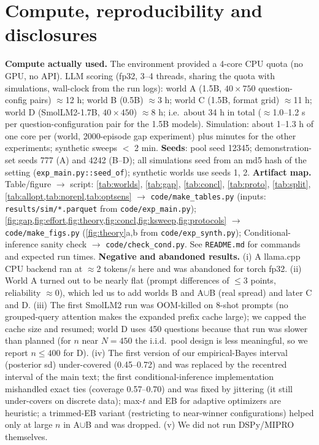 \section{Compute, reproducibility and disclosures}
\label{app:repro}
\textbf{Compute actually used.} The environment provided a 4-core CPU quota (no GPU, no API). LLM scoring (fp32, 3--4 threads, sharing the quota with simulations, wall-clock from the run logs): world A (1.5B, $40\times750$ question-config pairs) $\approx$12 h; world B (0.5B) $\approx$3 h; world C (1.5B, format grid) $\approx$11 h; world D (SmolLM2-1.7B, $40\times450$) $\approx$8 h; i.e.\ about 34 h in total ($\approx$1.0--1.2 s per question-configuration pair for the 1.5B models). Simulation: about 1--1.3 h of one core per (world, 2000-episode gap experiment) plus minutes for the other experiments; synthetic sweeps $<$ 2 min. \textbf{Seeds}: pool seed 12345; demonstration-set seeds 777 (A) and 4242 (B--D); all simulations seed from an md5 hash of the setting (\texttt{exp\_main.py::seed\_of}); synthetic worlds use seeds 1, 2.
\textbf{Artifact map.} Table/figure $\to$ script: \cref{tab:worlds}, \cref{tab:gap}, \cref{tab:concl}, \cref{tab:proto}, \cref{tab:split}, \cref{tab:allopt,tab:norepl,tab:optsens} $\to$ \texttt{code/make\_tables.py} (inputs: \texttt{results/sim/*.parquet} from \texttt{code/exp\_main.py}); \cref{fig:gap,fig:effort,fig:theory,fig:concl,fig:ksweep,fig:protocols} $\to$ \texttt{code/make\_figs.py} (\cref{fig:theory}a,b from \texttt{code/exp\_synth.py}); Conditional-inference sanity check $\to$ \texttt{code/check\_cond.py}. See \texttt{README.md} for commands and expected run times.
\textbf{Negative and abandoned results.} (i) A llama.cpp CPU backend ran at $\approx$2 tokens/s here and was abandoned for torch fp32. (ii) World A turned out to be nearly flat (prompt differences of $\le$3 points, reliability $\approx 0$), which led us to add worlds B and A$\cup$B (real spread) and later C and D. (iii) The first SmolLM2 run was OOM-killed on 8-shot prompts (no grouped-query attention makes the expanded prefix cache large); we capped the cache size and resumed; world D uses 450 questions because that run was slower than planned (for $n$ near $N{=}450$ the i.i.d.\ pool design is less meaningful, so we report $n\le400$ for D). (iv) The first version of our empirical-Bayes interval (posterior sd) under-covered (0.45--0.72) and was replaced by the recentred interval of the main text; the first conditional-inference implementation mishandled exact ties (coverage 0.57--0.70) and was fixed by jittering (it still under-covers on discrete data); max-$t$ and EB for adaptive optimizers are heuristic; a trimmed-EB variant (restricting to near-winner configurations) helped only at large $n$ in A$\cup$B and was dropped. (v) We did not run DSPy/MIPRO themselves.
